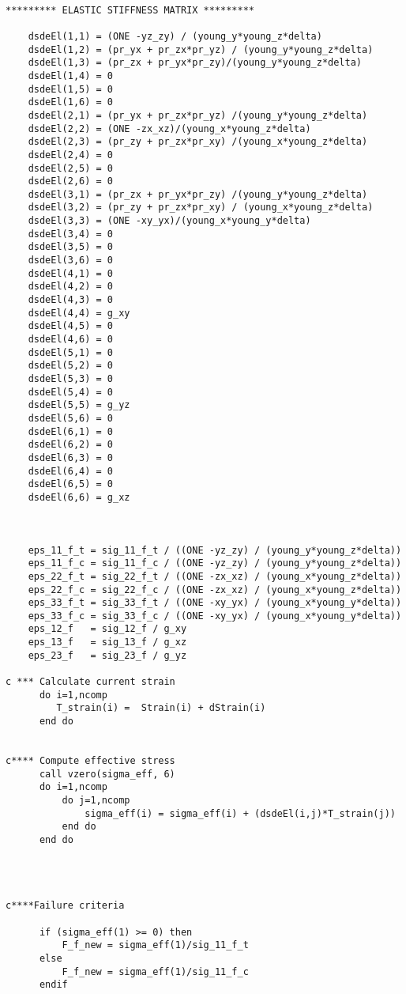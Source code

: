\begin{lstlisting}
	


     
********* ELASTIC STIFFNESS MATRIX *********
	
	dsdeEl(1,1) = (ONE -yz_zy) / (young_y*young_z*delta)
	dsdeEl(1,2) = (pr_yx + pr_zx*pr_yz) / (young_y*young_z*delta)
	dsdeEl(1,3) = (pr_zx + pr_yx*pr_zy)/(young_y*young_z*delta)
    dsdeEl(1,4) = 0
	dsdeEl(1,5) = 0
	dsdeEl(1,6) = 0
	dsdeEl(2,1) = (pr_yx + pr_zx*pr_yz) /(young_y*young_z*delta)
    dsdeEl(2,2) = (ONE -zx_xz)/(young_x*young_z*delta)
	dsdeEl(2,3) = (pr_zy + pr_zx*pr_xy) /(young_x*young_z*delta) 
    dsdeEl(2,4) = 0
	dsdeEl(2,5) = 0
	dsdeEl(2,6) = 0
	dsdeEl(3,1) = (pr_zx + pr_yx*pr_zy) /(young_y*young_z*delta) 
    dsdeEl(3,2) = (pr_zy + pr_zx*pr_xy) / (young_x*young_z*delta)
    dsdeEl(3,3) = (ONE -xy_yx)/(young_x*young_y*delta)
	dsdeEl(3,4) = 0
	dsdeEl(3,5) = 0
	dsdeEl(3,6) = 0
	dsdeEl(4,1) = 0
	dsdeEl(4,2) = 0 
	dsdeEl(4,3) = 0
	dsdeEl(4,4) = g_xy
	dsdeEl(4,5) = 0
	dsdeEl(4,6) = 0
	dsdeEl(5,1) = 0
	dsdeEl(5,2) = 0 
	dsdeEl(5,3) = 0
	dsdeEl(5,4) = 0
	dsdeEl(5,5) = g_yz
	dsdeEl(5,6) = 0
	dsdeEl(6,1) = 0
	dsdeEl(6,2) = 0 
	dsdeEl(6,3) = 0
	dsdeEl(6,4) = 0
	dsdeEl(6,5) = 0
	dsdeEl(6,6) = g_xz

  
      
    eps_11_f_t = sig_11_f_t / ((ONE -yz_zy) / (young_y*young_z*delta))
    eps_11_f_c = sig_11_f_c / ((ONE -yz_zy) / (young_y*young_z*delta))
    eps_22_f_t = sig_22_f_t / ((ONE -zx_xz) / (young_x*young_z*delta))
    eps_22_f_c = sig_22_f_c / ((ONE -zx_xz) / (young_x*young_z*delta))
    eps_33_f_t = sig_33_f_t / ((ONE -xy_yx) / (young_x*young_y*delta))
    eps_33_f_c = sig_33_f_c / ((ONE -xy_yx) / (young_x*young_y*delta))
    eps_12_f   = sig_12_f / g_xy
    eps_13_f   = sig_13_f / g_xz 
    eps_23_f   = sig_23_f / g_yz

c *** Calculate current strain
      do i=1,ncomp
         T_strain(i) =  Strain(i) + dStrain(i) 
      end do

      
c**** Compute effective stress 
      call vzero(sigma_eff, 6)
      do i=1,ncomp
          do j=1,ncomp
              sigma_eff(i) = sigma_eff(i) + (dsdeEl(i,j)*T_strain(j))        
          end do
      end do        
      


      
c****Failure criteria
 
      if (sigma_eff(1) >= 0) then                    
          F_f_new = sigma_eff(1)/sig_11_f_t          
      else           
          F_f_new = sigma_eff(1)/sig_11_f_c  
      endif
            

\end{lstlisting}

